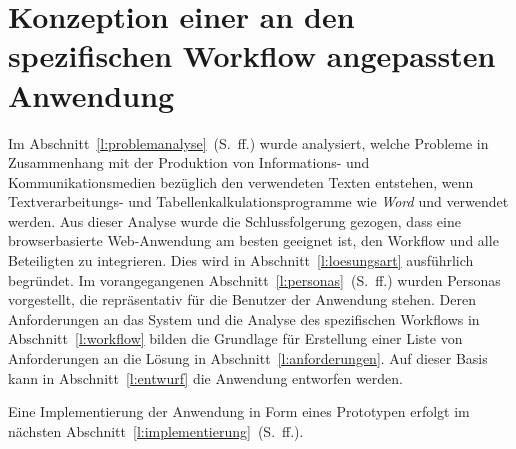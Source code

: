 \section{Konzeption einer an den spezifischen Workflow angepassten Anwendung}\label{l:konzeption}

Im Abschnitt~\ref{l:problemanalyse}~(S.\pageref{l:problemanalyse}~ff.) wurde analysiert, welche Probleme in Zusammenhang mit der Produktion von Informations- und Kommunikationsmedien bezüglich den verwendeten Texten entstehen, wenn Textverarbeitungs- und Tabellenkalkulationsprogramme wie  \emph{Word} und  verwendet werden. Aus dieser Analyse wurde die Schlussfolgerung gezogen, dass eine browserbasierte Web-Anwendung am besten geeignet ist, den Workflow und alle Beteiligten zu integrieren. Dies wird in Abschnitt~\ref{l:loesungsart} ausführlich begründet. Im vorangegangenen Abschnitt~\ref{l:personas}~(S.\pageref{l:personas}~ff.) wurden Personas vorgestellt, die repräsentativ für die Benutzer der Anwendung stehen. Deren Anforderungen an das System und die Analyse des spezifischen Workflows in Abschnitt~\ref{l:workflow} bilden die Grundlage für Erstellung einer Liste von Anforderungen an die Lösung in Abschnitt~\ref{l:anforderungen}. Auf dieser Basis kann in Abschnitt~\ref{l:entwurf} die Anwendung entworfen werden.

\bigskip

Eine Implementierung der Anwendung in Form eines Prototypen erfolgt im nächsten Abschnitt~\ref{l:implementierung}~(S.\pageref{l:implementierung}~ff.).











